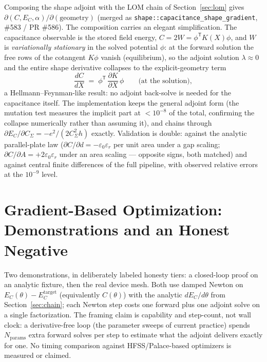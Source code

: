 \documentclass{anvil-paper}
\begin{document}
Composing the shape adjoint with the LOM chain of Section~\ref{sec:lom}
gives $\partial(C, E_C, \alpha)/\partial(\text{geometry})$ (merged as
\texttt{shape::capacitance\_shape\_gradient}, \#583 / PR \#586). The
composition carries an elegant simplification. The capacitance observable
is the stored field energy, $C = 2W = \phi^{\mathsf{T}}K(X)\phi$, and $W$
is \emph{variationally stationary} in the solved potential $\phi$: at the
forward solution the free rows of the cotangent $K\phi$ vanish
(equilibrium), so the adjoint solution $\lambda \approx 0$ and the entire
shape derivative collapses to the explicit-geometry term
\begin{equation}
  \frac{dC}{dX}
  \;=\; \phi^{\mathsf{T}}\,\frac{\partial K}{\partial X}\,\phi
  \qquad\text{(at the solution)},
  \label{eq:hf}
\end{equation}
a Hellmann--Feynman-like result: no adjoint back-solve is needed for the
capacitance itself. The implementation keeps the general adjoint form
(the mutation test measures the implicit part at $<10^{-8}$ of the
total, confirming the collapse numerically rather than assuming it), and
chains through $\partial E_C/\partial C_\Sigma = -e^2/(2C_\Sigma^2 h)$
exactly. Validation is double: against the analytic parallel-plate law
($\partial C/\partial d = -\varepsilon_0\varepsilon_r$ per unit area
under a gap scaling; $\partial C/\partial A = +2\varepsilon_0
\varepsilon_r$ under an area scaling --- opposite signs, both matched)
and against central finite differences of the full pipeline, with
observed relative errors at the $10^{-9}$ level.

\section{Gradient-Based Optimization: Demonstrations and an Honest
Negative}
\label{sec:optdemo}

Two demonstrations, in deliberately labeled honesty tiers: a closed-loop
proof on an analytic fixture, then the real device mesh. Both use damped
Newton on $E_C(\theta) - E_C^{\mathrm{target}}$ (equivalently
$C(\theta)$) with the analytic $dE_C/d\theta$ from
Section~\ref{sec:chain}; each Newton step costs one forward plus one
adjoint solve on a single factorization. The framing claim is
capability and step-count, not wall clock: a derivative-free loop
(the parameter sweeps of current practice) spends $N_{\mathrm{params}}$
extra forward solves per step to estimate what the adjoint delivers
exactly for one. No timing comparison against HFSS/Palace-based
optimizers is measured or claimed.
\end{document}
